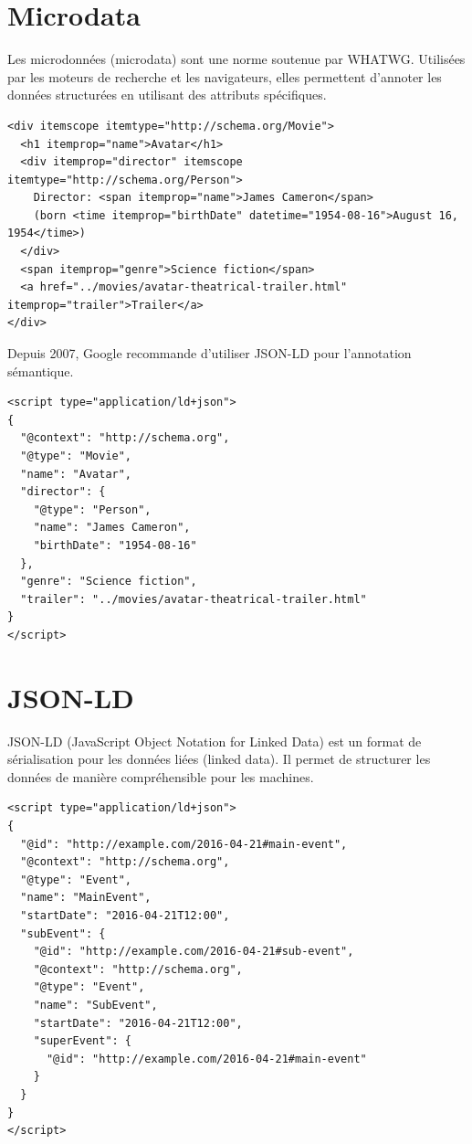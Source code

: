 \documentclass{report}
\begin{document}
\begin{multicols*}{2}
\section{Microdata}

\noindent
Les microdonnées (microdata) sont une norme soutenue par WHATWG. Utilisées par les moteurs de recherche et les navigateurs, elles permettent d'annoter les données structurées en utilisant des attributs spécifiques.

\begin{lstlisting}[style=HTMLDraculaDark]
<div itemscope itemtype="http://schema.org/Movie">
  <h1 itemprop="name">Avatar</h1>
  <div itemprop="director" itemscope itemtype="http://schema.org/Person">
    Director: <span itemprop="name">James Cameron</span>
    (born <time itemprop="birthDate" datetime="1954-08-16">August 16, 1954</time>)
  </div>
  <span itemprop="genre">Science fiction</span>
  <a href="../movies/avatar-theatrical-trailer.html" itemprop="trailer">Trailer</a>
</div>
\end{lstlisting}

\noindent
Depuis 2007, Google recommande d'utiliser JSON-LD pour l'annotation sémantique.

\begin{lstlisting}[style=HTMLDraculaDark]
<script type="application/ld+json">
{
  "@context": "http://schema.org",
  "@type": "Movie",
  "name": "Avatar",
  "director": {
    "@type": "Person",
    "name": "James Cameron",
    "birthDate": "1954-08-16"
  },
  "genre": "Science fiction",
  "trailer": "../movies/avatar-theatrical-trailer.html"
}
</script>
\end{lstlisting}



\section{JSON-LD}

\noindent
JSON-LD (JavaScript Object Notation for Linked Data) est un format de sérialisation pour les données liées (linked data). Il permet de structurer les données de manière compréhensible pour les machines.

\begin{lstlisting}[style=HTMLDraculaDark]
<script type="application/ld+json">
{
  "@id": "http://example.com/2016-04-21#main-event",
  "@context": "http://schema.org",
  "@type": "Event",
  "name": "MainEvent",
  "startDate": "2016-04-21T12:00",
  "subEvent": {
    "@id": "http://example.com/2016-04-21#sub-event",
    "@context": "http://schema.org",
    "@type": "Event",
    "name": "SubEvent",
    "startDate": "2016-04-21T12:00",
    "superEvent": {
      "@id": "http://example.com/2016-04-21#main-event"
    }
  }
}
</script>
\end{lstlisting}



\end{multicols*}
\end{document}
